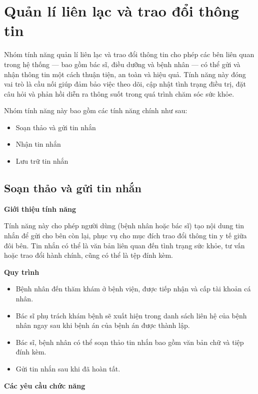 \section{Quản lí liên lạc và trao đổi thông tin}

Nhóm tính năng quản lí liên lạc và trao đổi thông tin cho phép các bên liên quan trong hệ thống — bao gồm bác sĩ, điều dưỡng và bệnh nhân — có thể gửi và nhận thông tin một cách thuận tiện, an toàn và hiệu quả. Tính năng này đóng vai trò là cầu nối giúp đảm bảo việc theo dõi, cập nhật tình trạng điều trị, đặt câu hỏi và phản hồi diễn ra thông suốt trong quá trình chăm sóc sức khỏe.

Nhóm tính năng này bao gồm các tính năng chính như sau:
\begin{itemize}
    \item Soạn thảo và gửi tin nhắn
    \item Nhận tin nhắn
    \item Lưu trữ tin nhắn
\end{itemize}

\subsection{Soạn thảo và gửi tin nhắn}

\noindent \textbf{Giới thiệu tính năng}

Tính năng này cho phép người dùng (bệnh nhân hoặc bác sĩ) tạo nội dung tin nhắn để gửi cho bên còn lại, phục vụ cho mục đích trao đổi thông tin y tế giữa đôi bên. Tin nhắn có thể là văn bản liên quan đến tình trạng sức khỏe, tư vấn hoặc trao đổi hành chính, cũng có thể là tệp đính kèm.

\noindent \textbf{Quy trình}

\begin{itemize}

\item Bệnh nhân đến thăm khám ở bệnh viện, được tiếp nhận và cấp tài khoản cá nhân.
\item Bác sĩ phụ trách khám bệnh sẽ xuất hiện trong danh sách liên hệ của bệnh nhân ngay sau khi bệnh án của bệnh án được thành lập.
\item Bác sĩ, bệnh nhân có thể soạn thảo tin nhắn bao gồm văn bản chữ và tiệp đính kèm.
\item Gửi tin nhắn sau khi đã hoàn tất.


\end{itemize}

\vspace{1em} \noindent \textbf{Các yêu cầu chức năng}

